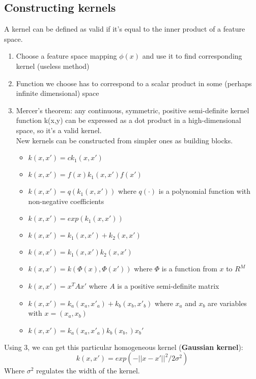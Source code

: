 \subsection{Constructing kernels}
    A kernel can be defined as valid if it's equal to the inner product of a feature space.
    \begin{enumerate}
        \item Choose a feature space mapping $\phi(x)$ and use it to find corresponding kernel (useless method)
        \item Function we choose has to correspond to a scalar product in some (perhaps infinite dimensional) space
        \item Mercer's theorem: any continuous, symmetric, positive semi-definite kernel function k(x,y) can be expressed as a dot product in a high-dimensional space, so it's a valid kernel.\\
        New kernels can be constructed from simpler ones as building blocks.
        \begin{itemize}
            \item $k(x, x') = c k_1 (x, x')$
            \item $k(x, x') = f(x) k_1 (x, x') f(x')$
            \item $k(x, x') = q(k_1(x, x'))$ where $q(\cdot)$ is a polynomial function with non-negative coefficients
            \item $k(x, x') = exp(k_1(x, x'))$
            \item $k(x, x') = k_1(x, x') + k_2(x, x')$
            \item $k(x, x') = k_1(x, x') k_2(x, x')$
            \item $k(x, x') = k(\Phi(x), \Phi(x'))$ where $\Phi$ is a function from $x$ to $R^M$ 
            \item $k(x, x') = x^T A x'$ where $A$ is a positive semi-definite matrix
            \item $k(x, x') = k_a(x_a, x' _ a) + k_b(x_b, x'_b)$ where $x_a$ and $x_b$ are variables with $x = (x_a, x_b)$
            \item $k(x, x') = k_a(x_a, x'_a)k_b(x_b, )x_b'$ 
        \end{itemize}
    \end{enumerate}
    Using 3, we can get this particular homogeneous kernel (\textbf{Gaussian kernel}):
    $$k(x,x')=exp(-||x-x'||^2/2\sigma^2)$$
    Where $\sigma^2$ regulates the width of the kernel.

